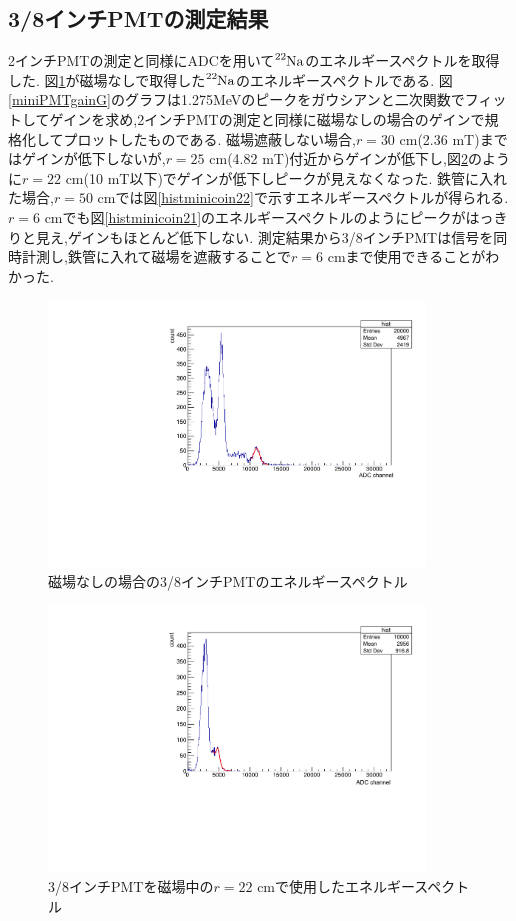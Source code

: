 \subsection{3/8インチPMTの測定結果}

2インチPMTの測定と同様にADCを用いて$\ce{^{22}Na}$のエネルギースペクトルを取得した.
図\ref{histminicoincidence2}が磁場なしで取得した$\ce{^{22}Na}$のエネルギースペクトルである.
図\ref{miniPMTgainG}のグラフは1.275MeVのピークをガウシアンと二次関数でフィットしてゲインを求め,2インチPMTの測定と同様に磁場なしの場合のゲインで規格化してプロットしたものである.
磁場遮蔽しない場合,$r=30$ cm(2.36 mT)まではゲインが低下しないが,$r=25$ cm(4.82 mT)付近からゲインが低下し,図\ref{histminicoout22}のように$r=22$ cm(10 mT以下)でゲインが低下しピークが見えなくなった.
鉄管に入れた場合,$r=50$ cmでは図\ref{histminicoin22}で示すエネルギースペクトルが得られる.$r=6$ cmでも図\ref{histminicoin21}のエネルギースペクトルのようにピークがはっきりと見え,ゲインもほとんど低下しない.
測定結果から3/8インチPMTは信号を同時計測し,鉄管に入れて磁場を遮蔽することで$r=6$ cmまで使用できることがわかった.

\begin{figure}[tbp]
	\centering
		\includegraphics[angle=-90,width=10cm]{fig/iguchi/minicoincidence2.pdf}
	\caption{磁場なしの場合の3/8インチPMTのエネルギースペクトル}
	\label{histminicoincidence2}
\end{figure}

\begin{figure}[tbp]
	\centering
		\includegraphics[angle=-90,width=10cm]{fig/iguchi/minicoout22.pdf}
	\caption{3/8インチPMTを磁場中の$r=22$ cmで使用したエネルギースペクトル}
	\label{histminicoout22}
\end{figure}

